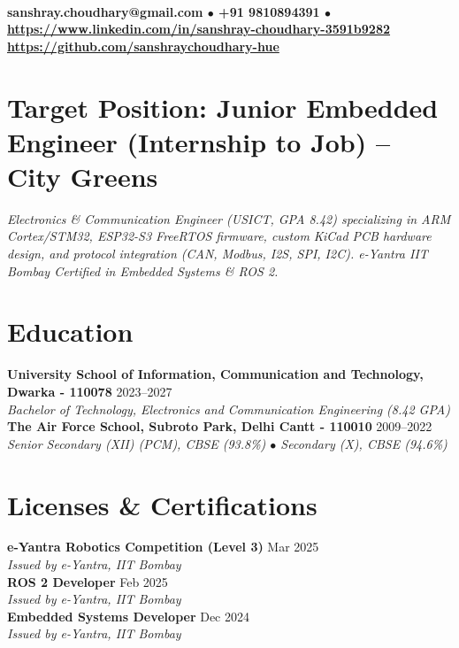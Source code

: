 \documentclass[10pt,a4paper]{article}%
\begin{document}
%
\normalsize%
 \vspace{3pt}\\%
\noindent \textbf{\scriptsize sanshray.choudhary@gmail.com $\bullet$ +91 9810894391 $\bullet$ \href{https://www.linkedin.com/in/sanshray-choudhary-3591b9282}{https://www.linkedin.com/in/sanshray-choudhary-3591b9282} \\ \href{https://github.com/sanshraychoudhary-hue}{https://github.com/sanshraychoudhary-hue}} \vspace{6pt}%

\section*{Target Position: Junior Embedded Engineer (Internship to Job) -- City Greens}%
\noindent \textit{Electronics \& Communication Engineer (USICT, GPA 8.42) specializing in ARM Cortex/STM32, ESP32-S3 FreeRTOS firmware, custom KiCad PCB hardware design, and protocol integration (CAN, Modbus, I2S, SPI, I2C). e-Yantra IIT Bombay Certified in Embedded Systems \& ROS 2.} \vspace{6pt}%

\section*{Education}%
\noindent \textbf{University School of Information, Communication and Technology, Dwarka - 110078} \hfill 2023--2027 \\%
\indent \textit{Bachelor of Technology, Electronics and Communication Engineering (8.42 GPA)} \vspace{6pt}\\%
\noindent \textbf{The Air Force School, Subroto Park, Delhi Cantt - 110010} \hfill 2009--2022 \\%
\indent \textit{Senior Secondary (XII) (PCM), CBSE (93.8\%) $\bullet$ Secondary (X), CBSE (94.6\%)} \vspace{6pt}%

\section*{Licenses \& Certifications}%
\noindent \textbf{e-Yantra Robotics Competition (Level 3)} \hfill Mar 2025 \\%
\indent \textit{Issued by e-Yantra, IIT Bombay} \vspace{4pt}\\%
\noindent \textbf{ROS 2 Developer} \hfill Feb 2025 \\%
\indent \textit{Issued by e-Yantra, IIT Bombay} \vspace{4pt}\\%
\noindent \textbf{Embedded Systems Developer} \hfill Dec 2024 \\%
\indent \textit{Issued by e-Yantra, IIT Bombay} \vspace{6pt}%
\end{document}
